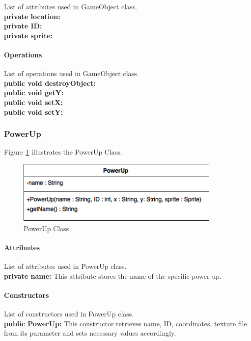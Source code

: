 \documentclass[12pt]{article} %
\begin{document}
List of attributes used in GameObject class.\\
\textbf{private location:} \\
\textbf{private ID:} \\
\textbf{private sprite:} \\

\paragraph{Operations \\}
List of operations used in GameObject class.\\
\textbf{public void destroyObject:}  \\
\textbf{public void getY:}  \\
\textbf{public void setX:}  \\
\textbf{public void setY:}  



\subsubsection{PowerUp} 

Figure \ref{fig:powerup} illustrates the PowerUp Class.
\begin{figure}[h!]
   \centering
   \vspace{10pt}%
   \includegraphics[width=10cm]{powerup.png}
   \caption{PowerUp Class}
   \label{fig:powerup}
\end{figure}

\paragraph{Attributes\\}

List of attributes used in PowerUp class.\\
\textbf{private name:} This attribute stores the name of the specific power up.

\paragraph{Constructors \\}
List of constructors used in PowerUp class.\\
\textbf{public PowerUp:} This constructor retrieves name, ID, coordinates, texture file from its parameter and sets necessary values accordingly.
\end{document}
